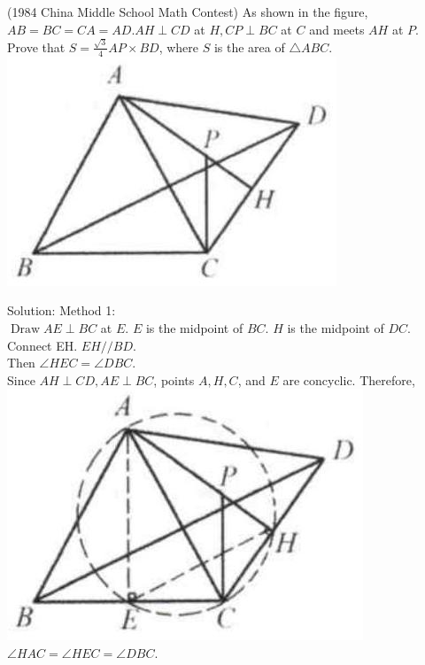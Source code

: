 \documentclass{article}
\begin{document}
(1984 China Middle School Math Contest) As shown in the figure, \(A B=B C=C A=A D . A H \perp C D\) at \(H, C P \perp B C\) at \(C\) and meets \(A H\) at \(P\). Prove that \(S=\frac{\sqrt{3}}{4} A P \times B D\), where \(S\) is the area of \(\triangle A B C\).\\
\centering
\includegraphics[width=\textwidth]{images/197(1).jpg}

Solution:
Method 1:\\
\(\operatorname{Draw} A E \perp B C\) at \(E\). \(E\) is the midpoint of \(B C\). \(H\) is the midpoint of \(D C\).\\
Connect EH. \(E H / / B D\).\\
Then \(\angle H E C=\angle D B C\).\\
Since \(A H \perp C D, A E \perp B C\), points \(A, H, C\), and \(E\) are concyclic. Therefore,\\
\centering
\includegraphics[width=\textwidth]{images/197(2).jpg}\\
\(\angle H A C=\angle H E C=\angle D B C\).
\end{document}

